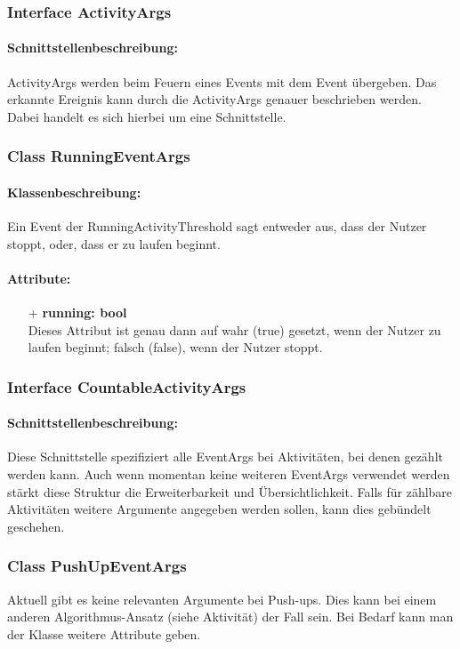\documentclass[a4paper,12pt]{article}
\begin{document}
	
	\subsubsection{Interface ActivityArgs}
	\paragraph{Schnittstellenbeschreibung:}
	ActivityArgs werden beim Feuern eines Events mit dem Event übergeben. Das erkannte Ereignis kann durch die ActivityArgs genauer beschrieben werden. Dabei handelt es sich hierbei um eine Schnittstelle. 
	
	\subsubsection{Class RunningEventArgs}
	\paragraph{Klassenbeschreibung:}
	Ein Event der RunningActivityThreshold sagt entweder aus, dass der Nutzer stoppt, oder, dass er zu laufen beginnt.
	\paragraph{Attribute:}
	\begin{itemize}
		\item[+] \textbf{running: bool}\\ Dieses Attribut ist genau dann auf wahr (true) gesetzt, wenn der Nutzer zu laufen beginnt; falsch (false), wenn der Nutzer stoppt.
	\end{itemize} 

	\subsubsection{Interface CountableActivityArgs}
	\paragraph{Schnittstellenbeschreibung:}
	Diese Schnittstelle spezifiziert alle EventArgs bei Aktivitäten, bei denen gezählt werden kann. Auch wenn momentan keine weiteren EventArgs verwendet werden stärkt diese Struktur die Erweiterbarkeit und Übersichtlichkeit. Falls für zählbare Aktivitäten weitere Argumente angegeben werden sollen, kann dies gebündelt geschehen.
	
	\subsubsection{Class PushUpEventArgs}
	Aktuell gibt es keine relevanten Argumente bei Push-ups. Dies kann bei einem anderen Algorithmus-Ansatz (siehe Aktivität) der Fall sein. Bei Bedarf kann man der Klasse weitere Attribute geben.
\end{document}
